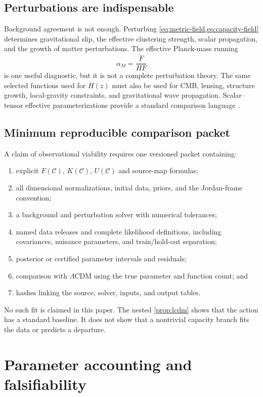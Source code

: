 \documentclass[11pt]{article}
\newcommand{\CC}{\mathcal C}
\begin{document}
\subsection{Perturbations are indispensable}

Background agreement is not enough.  Perturbing
\cref{eq:metric-field,eq:capacity-field} determines gravitational slip,
the effective clustering strength, scalar propagation, and the growth of
matter perturbations.  The effective Planck-mass running
\[
 \alpha_M=\frac{\dot F}{HF}
\]
is one useful diagnostic, but it is not a complete perturbation theory.
The same selected functions used for $H(z)$ must also be used for CMB,
lensing, structure growth, local-gravity constraints, and gravitational
wave propagation.  Scalar--tensor effective parameterizations provide a
standard comparison language \cite{bellini_sawicki_2014}.

\subsection{Minimum reproducible comparison packet}

A claim of observational viability requires one versioned packet
containing:
\begin{enumerate}
\item explicit $F(\CC)$, $K(\CC)$, $U(\CC)$ and source-map formulas;
\item all dimensional normalizations, initial data, priors, and the
Jordan-frame convention;
\item a background and perturbation solver with numerical tolerances;
\item named data releases and complete likelihood definitions, including
covariances, nuisance parameters, and train/hold-out separation;
\item posterior or certified parameter intervals and residuals;
\item comparison with $\Lambda$CDM using the true parameter and function
count; and
\item hashes linking the source, solver, inputs, and output tables.
\end{enumerate}

No such fit is claimed in this paper.  The nested
\cref{prop:lcdm} shows that the action has a standard baseline.  It does
not show that a nontrivial capacity branch fits the data or predicts a
departure.

\section{Parameter accounting and falsifiability}
\end{document}
